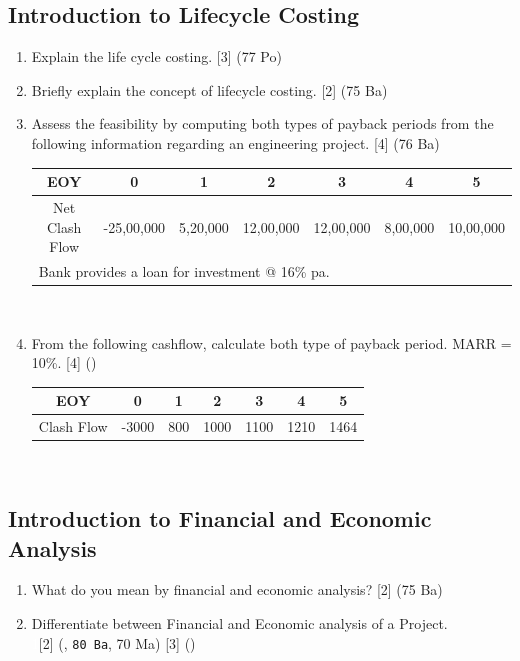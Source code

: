 \documentclass[12pt]{article}
\newcommand{\enter}{\\\textcolor{white}{1}}
\begin{document}
	\subsection{Introduction to Lifecycle Costing}
		\begin{enumerate}[noitemsep, topsep = 0pt]	
			\item Explain the life cycle costing. \hfill [3] (77 Po)
			
			\item Briefly explain the concept of lifecycle costing. \hfill [2] (75 Ba)

				\item Assess the feasibility by computing both types of payback periods from the following information regarding an engineering project. \hfill [4] (76 Ba)\\
			\begin{tabular}{|c|c|c|c|c|c|c|}
				\hline
				EOY & 0 & 1 & 2 & 3 & 4 & 5\\ \hline
				Net Clash Flow & -25,00,000 & 5,20,000 & 12,00,000 & 12,00,000 & 8,00,000 & 10,00,000\\ \hline
				\multicolumn{7}{|l|}{Bank provides a loan for investment @ 16\% pa.}\\ \hline
			\end{tabular}\\[0pt]

			\item From the following cashflow, calculate both type of payback period. MARR = 10\%. \hfill [4] ()
			\begin{tabular}{|c|c|c|c|c|c|c|}
				\hline
				EOY & 0 & 1 & 2 & 3 & 4 & 5\\ \hline
				Clash Flow & -3000 & 800 & 1000 & 1100 & 1210 & 1464\\ 
				\hline
			\end{tabular}\\[0pt]
		\end{enumerate}

	\subsection{Introduction to Financial and Economic Analysis}
		\begin{enumerate}[noitemsep, topsep = 0pt]
			\item What do you mean by financial and economic analysis? \hfill [2] (75 Ba)

			\item Differentiate between Financial and Economic analysis of a Project.
			\enter\hfill [2] (, \texttt{80 Ba}, 70 Ma) [3] ()
		\end{enumerate}
\end{document}

